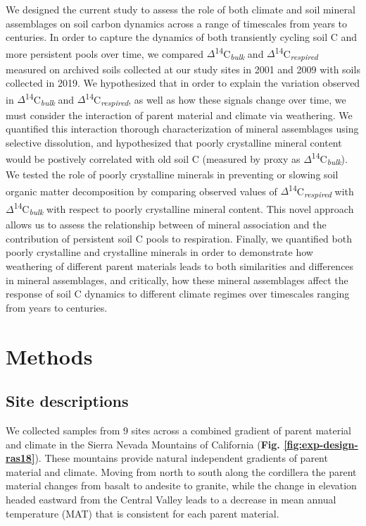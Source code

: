 \documentclass[english,man,floatsintext]{apa6}
\begin{document}
We designed the current study to assess the role of both climate and soil mineral assemblages on soil carbon dynamics across a range of timescales from years to centuries. In order to capture the dynamics of both transiently cycling soil C and more persistent pools over time, we compared \(\Delta\)\textsuperscript{14}C\textsubscript{\emph{bulk}} and \(\Delta\)\textsuperscript{14}C\textsubscript{\emph{respired}} measured on archived soils collected at our study sites in 2001 and 2009 with soils collected in 2019. We hypothesized that in order to explain the variation observed in \(\Delta\)\textsuperscript{14}C\textsubscript{\emph{bulk}} and \(\Delta\)\textsuperscript{14}C\textsubscript{\emph{respired}}, as well as how these signals change over time, we must consider the interaction of parent material and climate via weathering. We quantified this interaction thorough characterization of mineral assemblages using selective dissolution, and hypothesized that poorly crystalline mineral content would be postively correlated with old soil C (measured by proxy as \(\Delta\)\textsuperscript{14}C\textsubscript{\emph{bulk}}). We tested the role of poorly crystalline minerals in preventing or slowing soil organic matter decomposition by comparing observed values of \(\Delta\)\textsuperscript{14}C\textsubscript{\emph{respired}} with \(\Delta\)\textsuperscript{14}C\textsubscript{\emph{bulk}} with respect to poorly crystalline mineral content. This novel approach allows us to assess the relationship between of mineral association and the contribution of persistent soil C pools to respiration. Finally, we quantified both poorly crystalline and crystalline minerals in order to demonstrate how weathering of different parent materials leads to both similarities and differences in mineral assemblages, and critically, how these mineral assemblages affect the response of soil C dynamics to different climate regimes over timescales ranging from years to centuries.

\hypertarget{methods}{%
\section{Methods}\label{methods}}

\hypertarget{site-descriptions}{%
\subsection{Site descriptions}\label{site-descriptions}}

We collected samples from 9 sites across a combined gradient of parent material and climate in the Sierra Nevada Mountains of California (\textbf{Fig. \ref{fig:exp-design-ras18}}). These mountains provide natural independent gradients of parent material and climate. Moving from north to south along the cordillera the parent material changes from basalt to andesite to granite, while the change in elevation headed eastward from the Central Valley leads to a decrease in mean annual temperature (MAT) that is consistent for each parent material.
\end{document}
